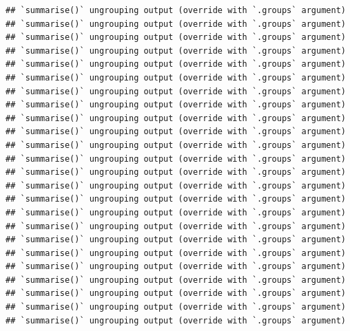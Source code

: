 \documentclass[
]{article}
\newenvironment{Shaded}{\begin{snugshade}}{\end{snugshade}}
\newcommand{\DataTypeTok}[1]{\textcolor[rgb]{0.13,0.29,0.53}{#1}}
\newcommand{\KeywordTok}[1]{\textcolor[rgb]{0.13,0.29,0.53}{\textbf{#1}}}
\newcommand{\NormalTok}[1]{#1}
\newcommand{\OperatorTok}[1]{\textcolor[rgb]{0.81,0.36,0.00}{\textbf{#1}}}
\newcommand{\OtherTok}[1]{\textcolor[rgb]{0.56,0.35,0.01}{#1}}
\newcommand{\StringTok}[1]{\textcolor[rgb]{0.31,0.60,0.02}{#1}}
\begin{document}
\begin{verbatim}
## `summarise()` ungrouping output (override with `.groups` argument)
## `summarise()` ungrouping output (override with `.groups` argument)
## `summarise()` ungrouping output (override with `.groups` argument)
## `summarise()` ungrouping output (override with `.groups` argument)
## `summarise()` ungrouping output (override with `.groups` argument)
## `summarise()` ungrouping output (override with `.groups` argument)
## `summarise()` ungrouping output (override with `.groups` argument)
## `summarise()` ungrouping output (override with `.groups` argument)
## `summarise()` ungrouping output (override with `.groups` argument)
## `summarise()` ungrouping output (override with `.groups` argument)
## `summarise()` ungrouping output (override with `.groups` argument)
## `summarise()` ungrouping output (override with `.groups` argument)
## `summarise()` ungrouping output (override with `.groups` argument)
## `summarise()` ungrouping output (override with `.groups` argument)
## `summarise()` ungrouping output (override with `.groups` argument)
## `summarise()` ungrouping output (override with `.groups` argument)
## `summarise()` ungrouping output (override with `.groups` argument)
## `summarise()` ungrouping output (override with `.groups` argument)
## `summarise()` ungrouping output (override with `.groups` argument)
## `summarise()` ungrouping output (override with `.groups` argument)
## `summarise()` ungrouping output (override with `.groups` argument)
## `summarise()` ungrouping output (override with `.groups` argument)
## `summarise()` ungrouping output (override with `.groups` argument)
## `summarise()` ungrouping output (override with `.groups` argument)
\end{verbatim}

\begin{Shaded}
\end{Shaded}
\end{document}
